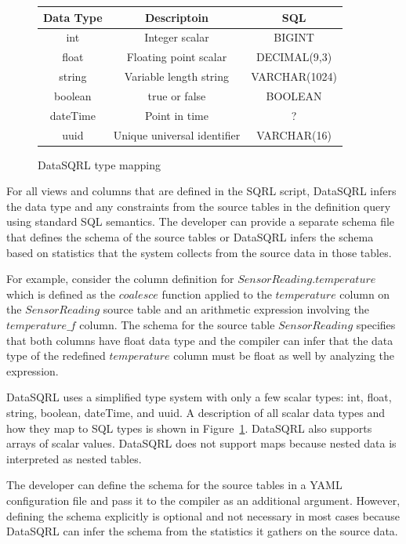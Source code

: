 \documentclass[	DIV=calc,%
							paper=letter,%
							fontsize=11pt,%
							twocolumn]{scrartcl}	 					%
\begin{document}
\begin{figure}[ht]
\begin{center}
\begin{tabular}{||c c c||}
 \hline
 Data Type & Descriptoin & SQL \\
 \hline
 int & Integer scalar & BIGINT \\
 float & Floating point scalar & DECIMAL(9,3) \\
 string & Variable length string & VARCHAR(1024) \\
 boolean & true or false & BOOLEAN \\
 dateTime & Point in time & ? \\
 uuid & Unique universal identifier & VARCHAR(16) \\
 \hline
\end{tabular}
\end{center}
\caption{DataSQRL type mapping}
\label{tbl:datatypes}
\end{figure}

For all views and columns that are defined in the SQRL script, DataSQRL infers the data type and any constraints from the source tables in the definition query using standard SQL semantics. The developer can provide a separate schema file that defines the schema of the source tables or DataSQRL infers the schema based on statistics that the system collects from the source data in those tables.

For example, consider the column definition for $SensorReading.temperature$ which is defined as the $coalesce$ function applied to the $temperature$ column on the $SensorReading$ source table and an arithmetic expression involving the $temperature\_f$ column. The schema for the source table $SensorReading$ specifies that both columns have float data type and the compiler can infer that the data type of the redefined $temperature$ column must be float as well by analyzing the expression.

DataSQRL uses a simplified type system with only a few scalar types: int, float, string, boolean, dateTime, and uuid. A description of all scalar data types and how they map to SQL types is shown in Figure~\ref{tbl:datatypes}. DataSQRL also supports arrays of scalar values. DataSQRL does not support maps because nested data is interpreted as nested tables.

The developer can define the schema for the source tables in a YAML configuration file and pass it to the compiler as an additional argument. However, defining the schema explicitly is optional and not necessary in most cases because DataSQRL can infer the schema from the statistics it gathers on the source data.
\end{document}

